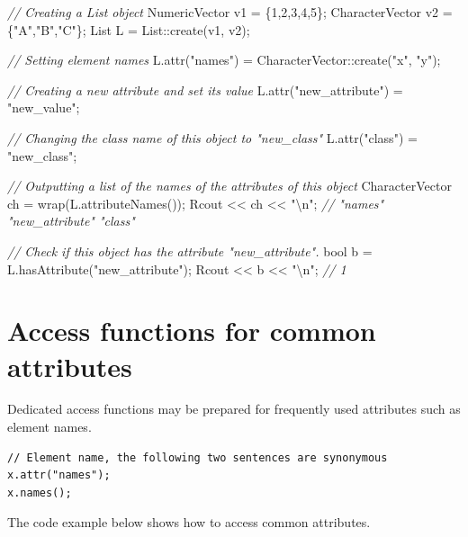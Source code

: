 \documentclass[]{book}
\newenvironment{Shaded}{\begin{snugshade}}{\end{snugshade}}
\newcommand{\DataTypeTok}[1]{\textcolor[rgb]{0.13,0.29,0.53}{#1}}
\newcommand{\DecValTok}[1]{\textcolor[rgb]{0.00,0.00,0.81}{#1}}
\newcommand{\SpecialCharTok}[1]{\textcolor[rgb]{0.00,0.00,0.00}{#1}}
\newcommand{\StringTok}[1]{\textcolor[rgb]{0.31,0.60,0.02}{#1}}
\newcommand{\CommentTok}[1]{\textcolor[rgb]{0.56,0.35,0.01}{\textit{#1}}}
\newcommand{\NormalTok}[1]{#1}
\theoremstyle{definition}
\theoremstyle{definition}
\theoremstyle{remark}
\begin{document}
\begin{Shaded}
\begin{Highlighting}[]
\CommentTok{// Creating a List object}
\NormalTok{NumericVector   v1 = \{}\DecValTok{1}\NormalTok{,}\DecValTok{2}\NormalTok{,}\DecValTok{3}\NormalTok{,}\DecValTok{4}\NormalTok{,}\DecValTok{5}\NormalTok{\};}
\NormalTok{CharacterVector v2 = \{}\StringTok{"A"}\NormalTok{,}\StringTok{"B"}\NormalTok{,}\StringTok{"C"}\NormalTok{\};}
\NormalTok{List L = List::create(v1, v2);}

\CommentTok{// Setting element names}
\NormalTok{L.attr(}\StringTok{"names"}\NormalTok{) = CharacterVector::create(}\StringTok{"x"}\NormalTok{, }\StringTok{"y"}\NormalTok{);}

\CommentTok{// Creating a new attribute and set its value}
\NormalTok{L.attr(}\StringTok{"new_attribute"}\NormalTok{) = }\StringTok{"new_value"}\NormalTok{;}

\CommentTok{// Changing the class name of this object to "new_class"}
\NormalTok{L.attr(}\StringTok{"class"}\NormalTok{) = }\StringTok{"new_class"}\NormalTok{;}

\CommentTok{// Outputting a list of the names of the attributes of this object}
\NormalTok{CharacterVector ch = wrap(L.attributeNames());}
\NormalTok{Rcout << ch << }\StringTok{"}\SpecialCharTok{\textbackslash{}n}\StringTok{"}\NormalTok{; }\CommentTok{// "names" "new_attribute" "class"}

\CommentTok{// Check if this object has the attribute "new_attribute".}
\DataTypeTok{bool}\NormalTok{ b = L.hasAttribute(}\StringTok{"new_attribute"}\NormalTok{);}
\NormalTok{Rcout << b << }\StringTok{"}\SpecialCharTok{\textbackslash{}n}\StringTok{"}\NormalTok{; }\CommentTok{// 1}
\end{Highlighting}
\end{Shaded}

\section{Access functions for common
attributes}\label{access-functions-for-common-attributes}

Dedicated access functions may be prepared for frequently used
attributes such as element names.

\begin{verbatim}
// Element name, the following two sentences are synonymous
x.attr("names");
x.names();
\end{verbatim}

The code example below shows how to access common attributes.
\end{document}
